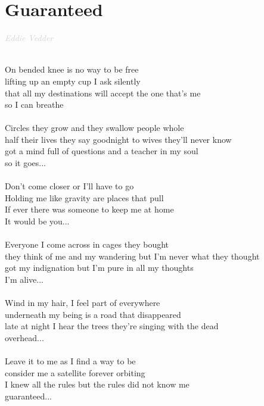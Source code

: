 \documentclass[a5paper, 10pt]{book}
\begin{document}
\section{Guaranteed}\textcolor{lightgray}{\textit{Eddie Vedder}}\\~\\
\begin{minipage}[t]{0.84\textwidth}
On bended knee is no way to be free \\
lifting up an empty cup I ask silently\\
that all my destinations will accept the one that's me\\
so I can breathe \\
\\
Circles they grow and they swallow people whole\\
half their lives they say goodnight to wives they'll never know\\
got a mind full of questions and a teacher in my soul \\
so it goes... \\
\\
Don't come closer or I'll have to go\\
Holding me like gravity are places that pull \\
If ever there was someone to keep me at home \\
It would be you...\\
\\
Everyone I come across in cages they bought\\
they think of me and my wandering but I'm never what they thought \\
got my indignation but I'm pure in all my thoughts \\
I'm alive... \\
\\
Wind in my hair, I feel part of everywhere \\
underneath my being is a road that disappeared \\
late at night I hear the trees they're singing with the dead \\
overhead... \\
\\
Leave it to me as I find a way to be \\
consider me a satellite forever orbiting \\
I knew all the rules but the rules did not know me \\
guaranteed...\\
\\

\end{minipage}
\end{document}
